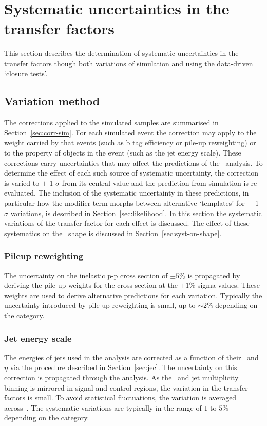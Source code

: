 \section{Systematic uncertainties in the transfer factors}
\label{sec:syst-uncs}
This section describes the determination of systematic uncertainties 
in the transfer factors though both variations of simulation
and using the data-driven `closure tests'. 

\subsection{Variation method}
\label{sec:syst-uncs-var}
The corrections applied to the simulated samples are summarised in Section~\ref{sec:corr-sim}. For each 
simulated event the correction may apply to the weight carried by that events (such as b tag efficiency
or pile-up reweighting) or to the property of objects in the event (such as the jet energy scale). 
These corrections carry uncertainties that may affect the predictions of the \alphat~analysis.
To determine the effect of each such source of systematic uncertainty, the correction is varied to $\pm$ 1 $\sigma$ from its central value and the prediction from simulation is re-evaluated. The inclusion of the systematic uncertainty 
in these predictions, in particular how the modifier term morphs between alternative `templates'  
for $\pm$ 1 $\sigma$ variations, is described in Section~\ref{sec:likelihood}. In this section the systematic variations
of the transfer factor for each effect is discussed. The effect of these systematics on 
the \mht~shape is discussed in Section~\ref{sec:syst-on-shape}.

\subsubsection{Pileup reweighting}

The uncertainty on the inelastic p-p cross section of $\pm5\%$ is propagated by deriving the pile-up
weights for the cross section at the $\pm1\%$ sigma values. These weights are used to derive
alternative predictions for each variation. Typically the uncertainty 
introduced by pile-up reweighting is small, up to $\sim2\%$ depending on the category.

\subsubsection{Jet energy scale}
\label{sec:tfSyst_jec}
The energies of jets used in the analysis are corrected as a function of their \pt~and
$\eta$ via the procedure described in Section~\ref{sec:jec}. The uncertainty on
this correction is propagated through the analysis. As the \scalht~and jet multiplicity binning is 
mirrored in signal and control regions, the variation in the transfer factors is small.
To avoid statistical fluctuations, the variation is averaged across~\nb.
The systematic variations are typically in the range of $1$ to $5\%$ depending on the category.

